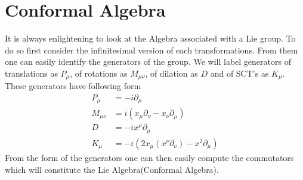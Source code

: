 \documentclass[12pt,a4paper,oneside]{book}
\theoremstyle{definition}
\begin{document}
    \section{Conformal Algebra}\label{conformal algebra}
    It is always enlightening to look at the Algebra associated with a Lie group. To do so first consider the infinitesimal version of each transformations. From them one can easily identify the generators of the group. We will label generators of translations as $P_{\mu}$, of rotations as $M_{\mu\nu}$, of dilation as $D$ and of SCT's as $K_{\mu}$. These generators have following form
    \begin{subequations}
    \begin{align}
        P_{\mu} &= -i \partial_{\mu}\\
        M_{\mu\nu} &= i \left(x_{\mu}\partial_{\nu} - x_{\nu}\partial_{\mu} \right)\\
        D &= -i x^{\mu}\partial_{\mu} \\
        K_{\mu} &= -i \left(2x_{\mu}(x^{\nu}\partial_{\nu}) - x^2\partial_{\mu} \right)
    \end{align}
    \end{subequations}
    From the form of the generators one can then easily compute the commutators which will constitute the Lie Algebra(Conformal Algebra).
\end{document}
